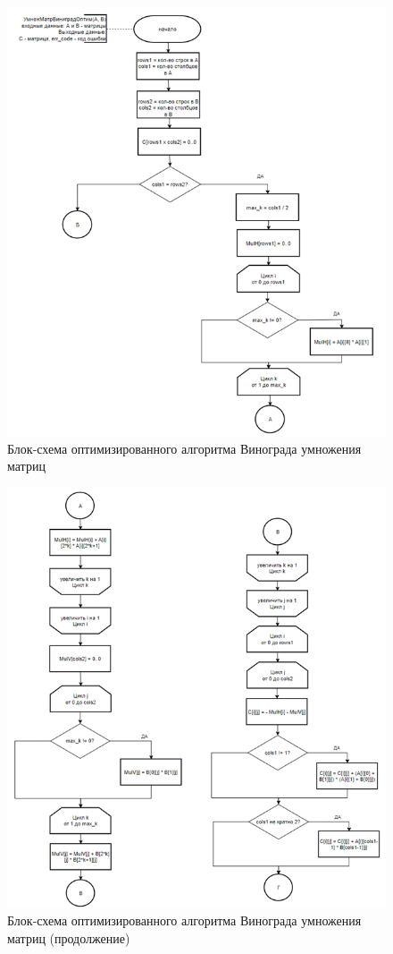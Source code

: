 \begin{figure}[H]
    \centering
    \includegraphics[width=1.05\textwidth]{img/block_3_1.png}
    \caption{Блок-схема оптимизированного алгоритма Винограда умножения матриц}
    \label{fig:block_3_1}
\end{figure}

\begin{figure}[H]
    \centering
    \includegraphics[width=1.05\textwidth]{img/block_3_2.png}
    \caption{Блок-схема оптимизированного алгоритма Винограда умножения матриц (продолжение)}
    \label{fig:block_3_2}
\end{figure}

